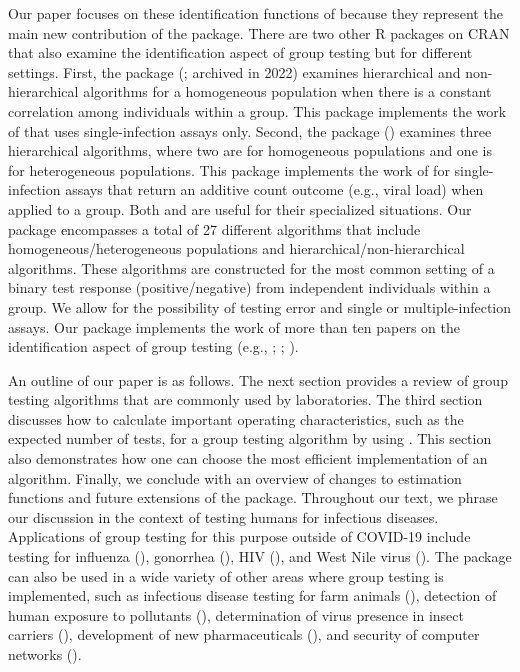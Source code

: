 Our paper focuses on these identification functions of 
because they represent the main new contribution of the package.
There are two other R packages on CRAN that also examine the identification
aspect of group testing but for different settings. First, the 
package (\citealt{gtcorr}; archived in 2022) examines hierarchical
and non-hierarchical algorithms for a homogeneous population when
there is a constant correlation among individuals within a group.
This package implements the work of \citet{lendle2012group} that
uses single-infection assays only. Second, the  package
(\citealt{mMPA}) examines three hierarchical algorithms, where two
are for homogeneous populations and one is for heterogeneous populations.
This package implements the work of \citet{tao2017improved} for single-infection
assays that return an additive count outcome (e.g., viral load) when
applied to a group. Both  and  are useful
for their specialized situations. Our package encompasses a total
of 27 different algorithms that include homogeneous/heterogeneous
populations and hierarchical/non-hierarchical algorithms. These algorithms
are constructed for the most common setting of a binary test response
(positive/negative) from independent individuals within a group. We
allow for the possibility of testing error and single or multiple-infection
assays. Our package implements the work of more than ten papers on
the identification aspect of group testing (e.g., \citealt{Kim2007};
\citealt{mcmahan2012two}; \citealt{houarray1}).

An outline of our paper is as follows. The next section  provides
a review of group testing algorithms that are commonly used by laboratories.
The third section discusses how to calculate important operating characteristics,
such as the expected number of tests, for a group testing algorithm
by using . This section also demonstrates how one
can choose the most efficient implementation of an algorithm. Finally,
we conclude with an  overview of changes to estimation functions
and future extensions of the package. Throughout our text,
we phrase our discussion in the context of testing humans for infectious
diseases. Applications of group testing for this purpose outside
of COVID-19 include testing for influenza (\citealt{van2012pooling}),
gonorrhea (\citealt{ando2020modified}), HIV (\citealt{kim2014pooled}),
and West Nile virus (\citealt{ARC}). The package can also be used
in a wide variety of other areas where group testing is implemented,
such as infectious disease testing for farm animals (\citealt{NVDC}),
detection of human exposure to pollutants (\citealt{thai2020analysis}),
determination of virus presence in insect carriers (\citealt{zhao2020thrips}),
development of new pharmaceuticals (\citealt{salzer2016screening}),
and security of computer networks (\citealt{thai2011group}).


